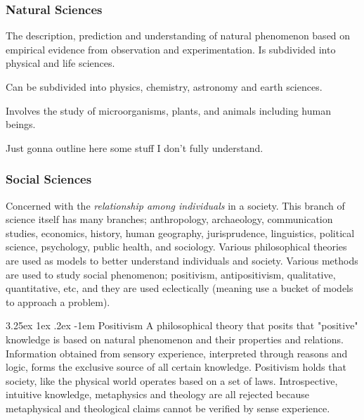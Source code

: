 \documentclass{article}
\makeatletter
\newcounter{subsubsubsection}[subsubsection]
\renewcommand\subparagraph{\@startsection{subparagraph}{6}{\parindent}%
  {3.25ex \@plus1ex \@minus .2ex}%
  {-1em}%
  {\normalfont\normalsize\bfseries}}
\makeatother
\begin{document}
\newpage

\newpage

\subsubsection{Natural Sciences}\label{sec:natural-sciences}

The description, prediction and understanding of natural phenomenon based on empirical evidence from observation and experimentation. Is subdivided into physical and life sciences. 

\newpage

Can be subdivided into physics, chemistry, astronomy and earth sciences. 

\newpage

Involves the study of microorganisms, plants, and animals including human beings.

\newpage

Just gonna outline here some stuff I don't fully understand.

\subsubsection{Social Sciences}\label{sec:social-sciences}

Concerned with the \textit{relationship among individuals} in a society. This branch of science itself has many branches; anthropology, archaeology, communication studies, economics, history, human geography, jurisprudence, linguistics, political science, psychology, public health, and sociology.
Various philosophical theories are used as models to better understand individuals and society. Various methods are used to study social phenomenon; positivism, antipositivism, qualitative, quantitative, etc, and they are used eclectically (meaning use a bucket of models to approach a problem). 

\newpage


\subparagraph{Positivism}
A philosophical theory that posits that "positive" knowledge is based on natural phenomenon and their properties and relations. Information obtained from sensory experience, interpreted through reasons and logic, forms the exclusive source of all certain knowledge. Positivism holds that society, like the physical world operates based on a set of laws. Introspective, intuitive knowledge, metaphysics and theology are all rejected because metaphysical and theological claims cannot be verified by sense experience.
\end{document}
